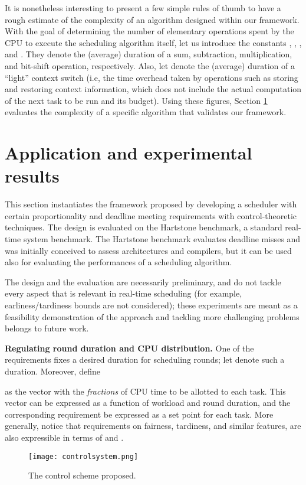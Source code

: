 \documentclass[a4paper]{article}
\begin{document}
It is nonetheless interesting to present a few simple rules of thumb to have a
rough estimate of the complexity of an algorithm designed within our framework.
With the goal of determining the number of elementary operations spent by the
CPU to execute the scheduling algorithm itself, let us introduce the constants
, , , and .
They denote the (average) duration of a sum, subtraction, multiplication, and
bit-shift operation, respectively.
Also, let  denote the (average) duration of a ``light'' context switch (i.e, the time overhead taken by operations such as storing and restoring context information, which does not include the actual computation of the next task to be run and its budget). Using these figures, Section \ref{sec:experimental} evaluates the 
complexity of a specific algorithm that validates our framework.

\section{Application and experimental results}
\label{sec:experimental}
This section instantiates the framework proposed by developing a 
scheduler with certain proportionality and deadline meeting requirements 
with control-theoretic techniques.
The design is evaluated on the Hartstone \cite{Hartstone-1992a,Weiderman-1989a}
benchmark, a standard real-time system benchmark.
The Hartstone benchmark evaluates deadline misses and was initially conceived 
to assess architectures and compilers, but it can be used also for evaluating 
the performances of a scheduling algorithm.

The design and the evaluation are necessarily preliminary, and do not tackle every aspect that is relevant in real-time scheduling (for example, earliness/tardiness bounds are not considered); these experiments are meant as a feasibility demonstration of the approach and tackling more challenging problems belongs to future work.

\textbf{Regulating round duration and CPU distribution.}
One of the requirements fixes a desired duration for scheduling rounds; 
let  denote such a duration.
Moreover, define

as the vector with the \emph{fractions} of CPU time to be allotted to each task.
This vector can be expressed as a function of workload and round duration, and
the corresponding requirement be expressed as a set point for each task.
More generally, notice that requirements on fairness, tardiness, and similar 
features, are also expressible in terms of  and 
.
\begin{figure*}[t]
 \centering
 \texttt{[image: controlsystem.png]}
 \caption{The control scheme proposed.}
 \label{fig:ProposedScheme-TwoLoopsLinear}
\end{figure*}
\end{document}
